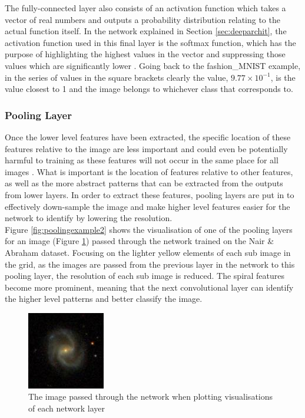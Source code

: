 \documentclass[12pt, onecolumn]{aa}
\begin{document}
The fully-connected layer also consists of an activation function which takes a vector of real numbers and outputs a probability distribution relating to the actual function itself. In the network explained in Section \ref{sec:deeparchit}, the activation function used in this final layer is the softmax function, which has the purpose of highlighting the highest values in the vector and suppressing those values which are significantly lower \citep{Bishop:998831}. Going back to the fashion\_MNIST example, in the series of values in the square brackets clearly the value, $9.77\times10^{-1}$, is the value closest to 1 and the image belongs to whichever class that corresponds to.



\subsubsection{Pooling Layer}
Once the lower level features have been extracted, the specific location of these features relative to the image are less important and could even be potentially harmful to training as these features will not occur in the same place for all images \citep{Lecun1998}. What is important is the location of features relative to other features, as well as the more abstract patterns that can be extracted from the outputs from lower layers. In order to extract these features, pooling layers are put in to effectively down-sample the image and make higher level features easier for the network to identify by lowering the resolution.\\

Figure  \ref{fig:poolingexample2} shows the visualisation of one of the pooling layers for an image (Figure \ref{fig:testimage}) passed through the network trained on the Nair \& Abraham dataset. Focusing on the lighter yellow elements of each sub image in the grid, as the images are passed from the previous layer in the network to this pooling layer, the resolution of each sub image is reduced. The spiral features become more prominent, meaning that the next convolutional layer can identify the higher level patterns and better classify the image.

\begin{figure}
    \centering
    \includegraphics[scale=1]{Figures/10249.jpg}
    \caption{The image passed through the network when plotting visualisations of each network layer}
    \label{fig:testimage}
\end{figure}
\end{document}
